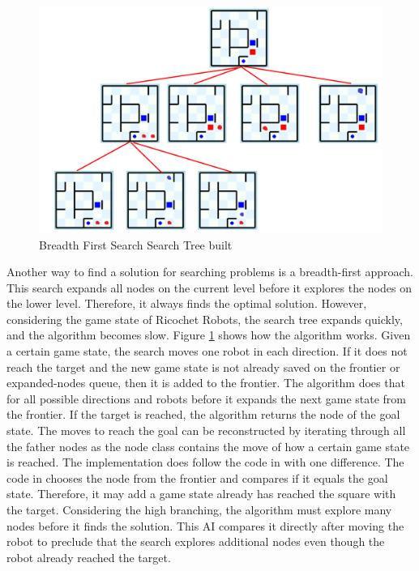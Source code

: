\documentclass[a4paper,10pt]{article}
\begin{document}
  \begin{figure}
  	\centering

  	\includegraphics[scale=0.50]{figures/bfs_tree.PNG}
  	\caption{Breadth First Search Search Tree built}
  	\label{fig:bfs_tree}
  \end{figure}
  Another way to find a solution for searching problems is a breadth-first approach. This search expands all nodes on the current level before it explores the nodes on the lower level. Therefore, it always finds the optimal solution. However, considering the game state of Ricochet Robots, the search tree expands quickly, and the algorithm becomes slow. Figure \ref{fig:bfs_tree} shows how the algorithm works. Given a certain game state, the search moves one robot in each direction. If it does not reach the target and the new game state is not already saved on the frontier or expanded-nodes queue, then it is added to the frontier. The algorithm does that for all possible directions and robots before it expands the next game state from the frontier. If the target is reached, the algorithm returns the node of the goal state. The moves to reach the goal can be reconstructed by iterating through all the father nodes as the node class contains the move of how a certain game state is reached. The implementation does follow the code in \cite{Textbook} with one difference. The code in \cite{Textbook} chooses the node from the frontier and compares if it equals the goal state. Therefore, it may add a game state already has reached the square with the target. Considering the high branching, the algorithm must explore many nodes before it finds the solution. This AI compares it directly after moving the robot to preclude that the search explores additional nodes even though the robot already reached the target.\\
\end{document}
